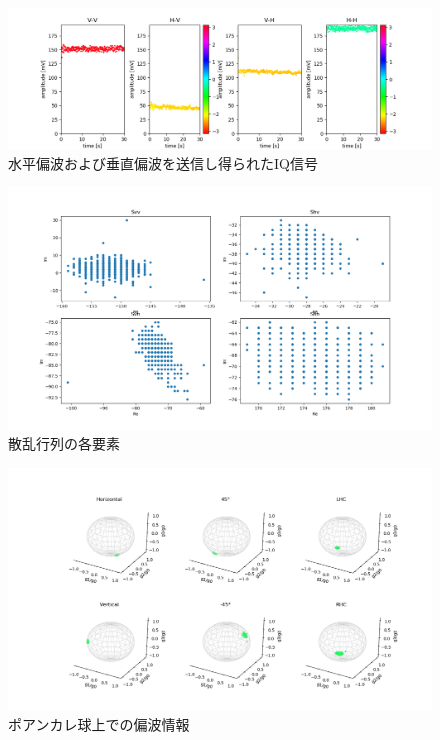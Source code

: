 \documentclass[uplatex,a4paper,10pt]{jsarticle}
\begin{document}
\begin{figure}[hbtp]
	\centering
	\includegraphics[scale=0.6]{../img/20220707_test_1_AmPh4_2Tx2Rx.png}
    \caption{水平偏波および垂直偏波を送信し得られたIQ信号}
	\label{fig:iq}
\end{figure}
\begin{figure}[hbtp]
	\centering
	\includegraphics[scale=0.4]{../img/20220707_test_1_IQ4_2Tx2Rx.png}
    \caption{散乱行列の各要素}
	\label{fig:scatter}
\end{figure}
\begin{figure}[hbtp]
	\centering
	\includegraphics[scale=0.5]{../img/20220707_test_1_PS_2.png}
    \caption{ポアンカレ球上での偏波情報}
	\label{fig:ps}
\end{figure}
\end{document}

